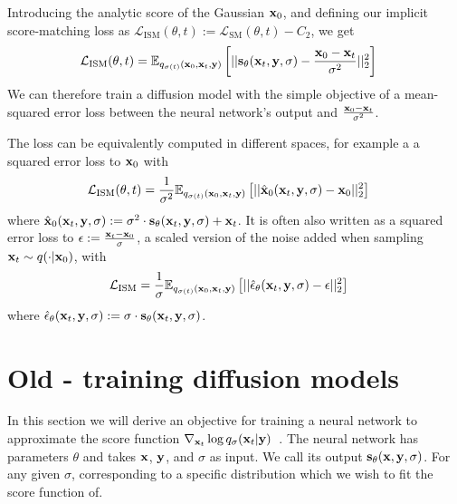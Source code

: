 Introducing the analytic score of the Gaussian ${\mathbf{x}}_0$, and defining our implicit score-matching loss as $\mathcal{L}_\text{ISM}(\theta, t) := \mathcal{L}_\text{SM}(\theta, t) - C_2$, we get
\begin{align}
    \mathcal{L}_\text{ISM}(\theta, t) &= \mathbb{E}_{q_{\sigma(t)}({\mathbf{x}}_0, {\mathbf{x}}_t, {\mathbf{y}})} \left[ 
    || {\mathbf{s}}_\theta({\mathbf{x}}_t, {\mathbf{y}}, \sigma) - \frac{{\mathbf{x}}_0-{\mathbf{x}}_t}{\sigma^2} ||_2^2 \right]
\end{align}
We can therefore train a diffusion model with the simple objective of a mean-squared error loss between the neural network's output and $\frac{{\mathbf{x}}_0-{\mathbf{x}}_t}{\sigma^2}$.

The loss can be equivalently computed in different spaces, for example a a squared error loss to ${\mathbf{x}}_0$ with
\begin{align}
    \mathcal{L}_\text{ISM}(\theta, t) &= \frac{1}{\sigma^2} \mathbb{E}_{q_{\sigma(t)}({\mathbf{x}}_0, {\mathbf{x}}_t, {\mathbf{y}})} \left[ 
    || \hat{{\mathbf{x}}}_0({\mathbf{x}}_t, {\mathbf{y}}, \sigma) - {\mathbf{x}}_0 ||_2^2 \right]
\end{align}
where $\hat{{\mathbf{x}}}_0({\mathbf{x}}_t, {\mathbf{y}}, \sigma) := \sigma^2 \cdot {\mathbf{s}}_\theta({\mathbf{x}}_t, {\mathbf{y}}, \sigma) + {\mathbf{x}}_t$. It is often also written as a squared error loss to $\epsilon := \frac{{\mathbf{x}}_t - {\mathbf{x}}_0}{\sigma}$, a scaled version of the noise added when sampling ${\mathbf{x}}_t \sim q(\cdot|{\mathbf{x}}_0)$, with
\begin{align}
    \mathcal{L}_\text{ISM} &= \frac{1}{\sigma} \mathbb{E}_{q_{\sigma(t)}({\mathbf{x}}_0, {\mathbf{x}}_t, {\mathbf{y}})} \left[ 
    || \hat{\mathbf{\epsilon}}_\theta({\mathbf{x}}_t, {\mathbf{y}}, \sigma) - \epsilon ||_2^2 \right]
\end{align}
where $\hat{\mathbf{\epsilon}}_\theta({\mathbf{x}}_t, {\mathbf{y}}, \sigma) := \sigma \cdot {\mathbf{s}}_\theta({\mathbf{x}}_t, {\mathbf{y}}, \sigma)$.



\section{Old - training diffusion models}

In this section we will derive an objective for training a neural network to approximate the score function $\nabla_{{\mathbf{x}}_t} \log q_\sigma({\mathbf{x}}_t |{\mathbf{y}})$~\citep{vincent2011connection,song2019generative}. The neural network has parameters $\theta$ and takes ${\mathbf{x}}$, ${\mathbf{y}}$, and $\sigma$ as input. We call its output ${\mathbf{s}}_\theta({\mathbf{x}}, {\mathbf{y}}, \sigma)$. For any given $\sigma$, corresponding to a specific distribution which we wish to fit the score function of. 


